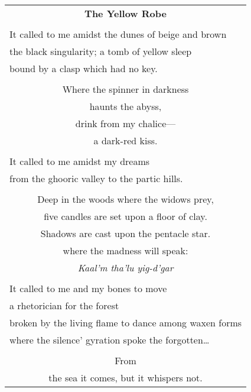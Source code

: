 \documentclass{article}
\begin{document}
\newcommand{\h}{\hspace*{4ex}}

\begin{center}
\begin{tabular}{l}
\multicolumn{1}{c}{\large\textbf{The Yellow Robe}} \\
\\
It called to me amidst the dunes of beige and brown \\
the black singularity; a tomb of yellow sleep \\
bound by a clasp which had no key. \\
\\
\multicolumn{1}{c}{Where the spinner in darkness} \\
\multicolumn{1}{c}{haunts the abyss,} \\
\multicolumn{1}{c}{drink from my chalice---} \\
\multicolumn{1}{c}{a dark-red kiss.} \\
\\
It called to me amidst my dreams \\
from the ghooric valley to the partic hills. \\
\\
\multicolumn{1}{c}{Deep in the woods where the widows prey,} \\
\multicolumn{1}{c}{five candles are set upon a floor of clay.} \\
\multicolumn{1}{c}{Shadows are cast upon the pentacle star.} \\
\multicolumn{1}{c}{where the madness will speak:} \\
\multicolumn{1}{c}{
	\textit{Kaal'm tha'lu yig-d'gar} %
} \\
\\
It called to me and my bones to move \\
a rhetorician for the forest \\
broken by the living flame to dance among waxen forms \\
where the silence' gyration spoke the forgotten\ldots{} \\
\\
\multicolumn{1}{c}{From} \\
\multicolumn{1}{c}{the sea it comes, but it whispers not.} \\

\end{tabular}
\end{center}
\end{document}
